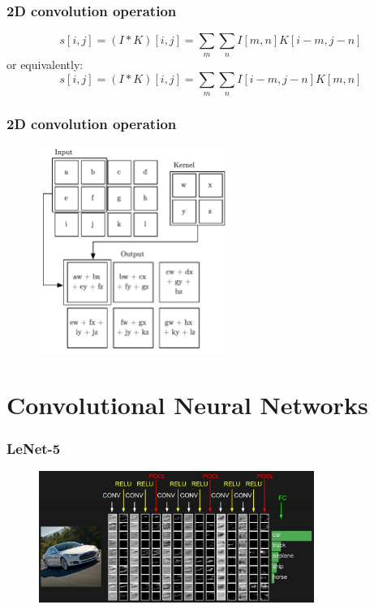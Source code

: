 \documentclass{beamer}
\begin{document}
\begin{frame}
  \frametitle{2D convolution operation}

  \begin{equation*}
    s[i,j]=(I*K)[i,j]=\sum_{m}\sum_{n}I[m,n]K[i-m, j-n]
  \end{equation*}
  or equivalently:
  \begin{equation*}
    s[i,j]=(I*K)[i,j]=\sum_{m}\sum_{n}I[i-m, j-n]K[m,n]
  \end{equation*}
\end{frame}

\begin{frame}
  \frametitle{2D convolution operation}

 \begin{figure}
    \centering
    \includegraphics[width=0.55\textwidth]{convolution_operation.png}
  \end{figure}
\end{frame}

\section{Convolutional Neural Networks}

\begin{frame}
  \frametitle{LeNet-5}
  \begin{figure}[!htm]
    \centering
    \includegraphics[width=0.8\textwidth]{convnet.jpeg}
  \end{figure}
\end{frame}
\end{document}
